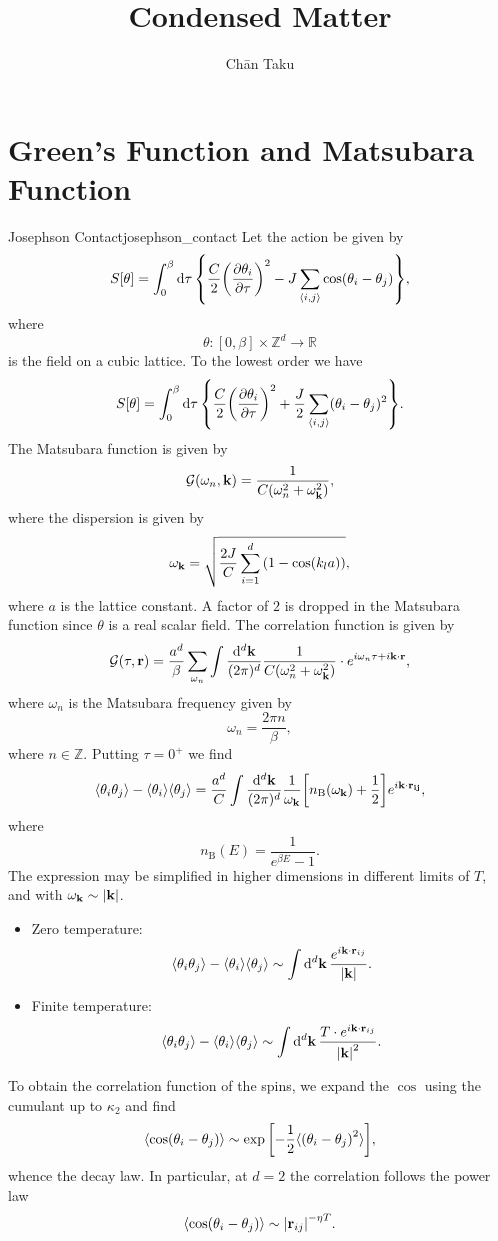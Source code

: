 \documentclass{article}
\title{Condensed Matter}
\author{Ch\=an Taku}
\begin{document}
\maketitle
\section{Green's Function and Matsubara Function}

\begin{example}{Josephson Contact}{josephson_contact}
    Let the action be given by
    \[ S[\theta] = \int_0^\beta \dd{\tau} \qty{ \frac{C}{2}\qty(\pdv{\theta_i}{\tau})^2 - J \sum_{\langle i,j \rangle} \cos(\theta_i - \theta_j) }, \]
    where
    \[ \theta: [0,\beta] \times \mathbb{Z}^d \rightarrow \mathbb{R} \]
    is the field on a cubic lattice. To the lowest order we have
    \[ S[\theta] = \int_0^\beta \dd{\tau} \qty{ \frac{C}{2}\qty(\pdv{\theta_i}{\tau})^2 + \frac{J}{2} \sum_{\langle i,j \rangle} (\theta_i - \theta_j)^2 }. \]
    The Matsubara function is given by
    \[ \mathcal{G}(\omega_n, \vb{k}) = \frac{1}{C(\omega_n^2 + \omega_{\vb{k}}^2)}, \]
    where the dispersion is given by
    \[ \omega_{\vb{k}} = \sqrt{\frac{2J}{C} \sum_{i=1}^d \qty(1 - \cos (k_l a))}, \]
    where $a$ is the lattice constant.
    A factor of $2$ is dropped in the Matsubara function since $\theta$ is a real scalar field.
    The correlation function is given by
    \[ \mathcal{G}(\tau, \vb{r}) = \frac{a^d}{\beta} \sum_{\omega_n} \int \frac{\dd{^d \vb{k}}}{(2\pi)^d} \frac{1}{C(\omega_n^2 + \omega_{\vb{k}}^2)} \cdot e^{i \omega_n \tau + i \vb{k} \cdot \vb{r}}, \]
    where $\omega_n$ is the Matsubara frequency given by
    \[ \omega_n = \frac{2\pi n}{\beta}, \]
    where $n\in \mathbb{Z}$.
    Putting $\tau = 0^+$ we find
    \[ \langle \theta_i \theta_j \rangle - \langle \theta_i \rangle \langle \theta_j \rangle = \frac{a^d}{C} \int \frac{\dd{^d \vb{k}}}{(2\pi)^d} \frac{1}{\omega_{\vb{k}}}\qty[n_{\mathrm{B}}(\omega_{\vb{k}}) + \frac{1}{2}] e^{i\vb{k}\cdot \vb{r_{ij}}}, \]
    where
    \[ n_{\mathrm{B}}(E) = \frac{1}{e^{\beta E} - 1}. \]
    The expression may be simplified in higher dimensions in different limits of $T$, and with $\omega_{\vb{k}} \sim \abs{\vb{k}}$.
    \begin{itemize}
        \item Zero temperature:
        \[ \langle \theta_i \theta_j \rangle - \langle \theta_i \rangle \langle \theta_j \rangle \sim \int \dd{^d \vb{k}} \frac{e^{i \vb{k}\cdot \vb{r}_{ij}}}{\abs{\vb{k}}}. \]
        \item Finite temperature:
        \[ \langle \theta_i \theta_j \rangle - \langle \theta_i \rangle \langle \theta_j \rangle \sim \int \dd{^d \vb{k}} \frac{T\cdot e^{i \vb{k}\cdot \vb{r}_{ij}}}{\abs{\vb{k}}^2}. \]
    \end{itemize}
    To obtain the correlation function of the spins, we expand the $\cos$ using the cumulant up to $\kappa_2$ and find
    \[ \langle \cos(\theta_i - \theta_j) \rangle \sim \exp\qty[-\frac{1}{2}\langle \qty(\theta_i - \theta_j)^2 \rangle], \]
    whence the decay law.
    In particular, at $d=2$ the correlation follows the power law
    \[ \langle \cos(\theta_i - \theta_j) \rangle \sim \abs{\vb{r}_{ij}}^{-\eta T}. \]
\end{example}

% 
% 
\end{document}
